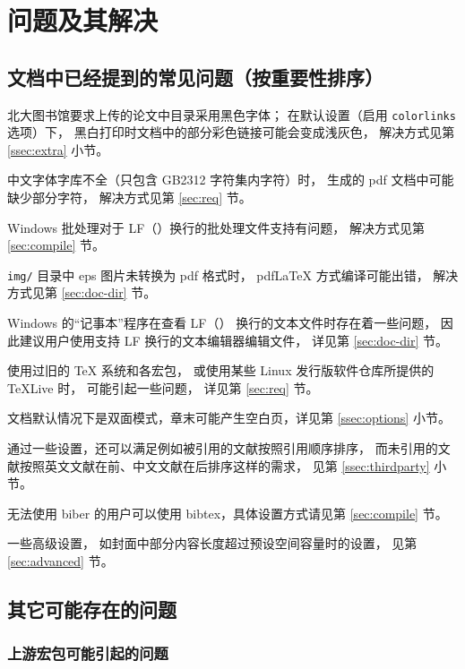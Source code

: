 %

\chapter{问题及其解决}
	\section{文档中已经提到的常见问题（按重要性排序）}

	北大图书馆要求上传的论文中目录采用黑色字体；
	在默认设置（启用 \verb|colorlinks| 选项）下，
	黑白打印时文档中的部分彩色链接可能会变成浅灰色，
	解决方式见第 \ref{ssec:extra} 小节。

	中文字体字库不全（只包含 GB2312 字符集内字符）时，
	生成的 pdf 文档中可能缺少部分字符，
	解决方式见第 \ref{sec:req} 节。

	Windows 批处理对于 LF（\texttt{\string\n}）换行的批处理文件支持有问题，
	解决方式见第 \ref{sec:compile} 节。

	\verb|img/| 目录中 eps 图片未转换为 pdf 格式时，%
	pdf\LaTeX{} 方式编译可能出错，
	解决方式见第 \ref{sec:doc-dir} 节。

	Windows 的“记事本”程序在查看 LF（\texttt{\string\n}）
	换行的文本文件时存在着一些问题，
	因此建议用户使用支持 LF 换行的文本编辑器编辑文件，
	详见第 \ref{sec:doc-dir} 节。

	使用过旧的 \TeX{} 系统和各宏包，
	或使用某些 Linux 发行版软件仓库所提供的 \TeX{}Live 时，
	可能引起一些问题，
	详见第 \ref{sec:req} 节。

	文档默认情况下是双面模式，章末可能产生空白页，详见第 \ref{ssec:options} 小节。

	通过一些设置，还可以满足例如被引用的文献按照引用顺序排序，
	而未引用的文献按照英文文献在前、中文文献在后排序这样的需求，
	见第 \ref{ssec:thirdparty} 小节。

	无法使用 biber 的用户可以使用 bibtex，具体设置方式请见第 \ref{sec:compile} 节。

	一些高级设置，
	如封面中部分内容长度超过预设空间容量时的设置，
	见第 \ref{sec:advanced} 节。

	\section{其它可能存在的问题}
		\subsection{上游宏包可能引起的问题}

